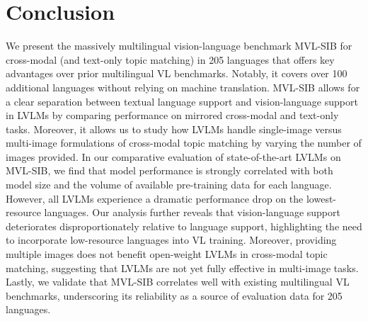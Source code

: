\section{Conclusion}
\label{sec:conclusion}
%

We present the massively multilingual vision-language benchmark MVL-SIB for cross-modal (and text-only topic matching) in 205 languages that offers key advantages over prior multilingual VL benchmarks. Notably, it covers over 100 additional languages without relying on machine translation. MVL-SIB allows for a clear separation between textual language support and vision-language support in LVLMs by comparing performance on mirrored cross-modal and text-only tasks. Moreover, it allows us to study how LVLMs handle single-image versus multi-image formulations of cross-modal topic matching by varying the number of images provided.
In our comparative evaluation of state-of-the-art LVLMs on MVL-SIB, we find that model performance is strongly correlated with both model size and the volume of available pre-training data for each language. However, all LVLMs experience a dramatic performance drop on the lowest-resource languages. Our analysis further reveals that vision-language support deteriorates disproportionately relative to language support, highlighting the need to incorporate low-resource languages into VL training. Moreover, providing multiple images does not benefit open-weight LVLMs in cross-modal topic matching, suggesting that LVLMs are not yet fully effective in multi-image tasks. Lastly, we validate that MVL-SIB correlates well with existing multilingual VL benchmarks, underscoring its reliability as a source of evaluation data for 205 languages.